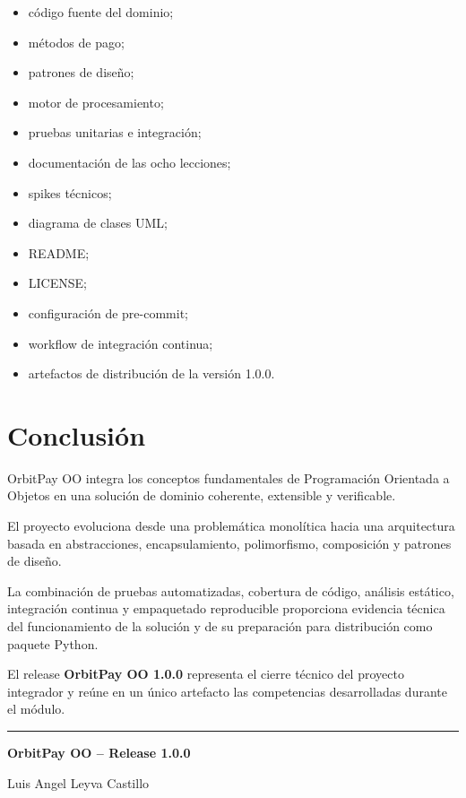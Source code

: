 \documentclass[11pt,a4paper]{article}
\begin{document}
\begin{itemize}
    \item código fuente del dominio;
    \item métodos de pago;
    \item patrones de diseño;
    \item motor de procesamiento;
    \item pruebas unitarias e integración;
    \item documentación de las ocho lecciones;
    \item spikes técnicos;
    \item diagrama de clases UML;
    \item README;
    \item LICENSE;
    \item configuración de pre-commit;
    \item workflow de integración continua;
    \item artefactos de distribución de la versión 1.0.0.
\end{itemize}

\section{Conclusión}

OrbitPay OO integra los conceptos fundamentales de Programación
Orientada a Objetos en una solución de dominio coherente,
extensible y verificable.

El proyecto evoluciona desde una problemática monolítica hacia
una arquitectura basada en abstracciones, encapsulamiento,
polimorfismo, composición y patrones de diseño.

La combinación de pruebas automatizadas, cobertura de código,
análisis estático, integración continua y empaquetado reproducible
proporciona evidencia técnica del funcionamiento de la solución
y de su preparación para distribución como paquete Python.

El release \textbf{OrbitPay OO 1.0.0} representa el cierre técnico
del proyecto integrador y reúne en un único artefacto las
competencias desarrolladas durante el módulo.

\vfill

\begin{center}
    \rule{0.7\textwidth}{0.5pt}

    \vspace{0.3cm}

    \textbf{OrbitPay OO -- Release 1.0.0}

    \smallskip

    Luis Angel Leyva Castillo
\end{center}
\end{document}
